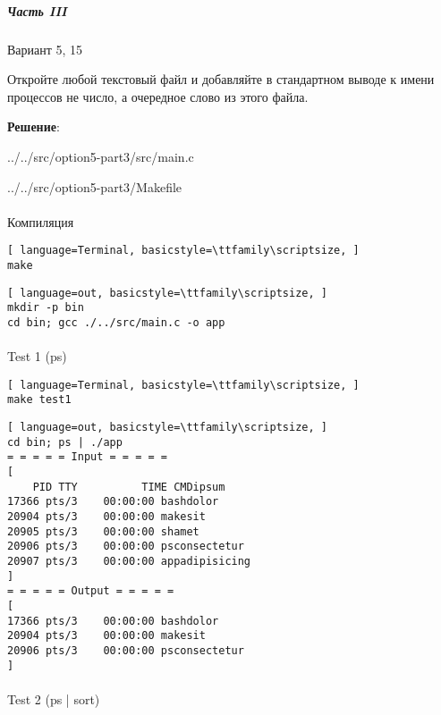\subparagraph{Часть III} Вариант 5, 15

Откройте любой текстовый файл и добавляйте в стандартном выводе к имени процессов не число, а очередное слово из этого файла.

\textbf{Решение}:


{../../src/option5-part3/src/main.c}


{../../src/option5-part3/Makefile}

\paragraph{}
Компиляция

\begin{lstlisting}[ language=Terminal, basicstyle=\ttfamily\scriptsize, ]
make
\end{lstlisting}

\begin{lstlisting}[ language=out, basicstyle=\ttfamily\scriptsize, ]
mkdir -p bin
cd bin; gcc ./../src/main.c -o app
\end{lstlisting}

\paragraph{}
Test 1 (ps)

\begin{lstlisting}[ language=Terminal, basicstyle=\ttfamily\scriptsize, ]
make test1
\end{lstlisting}

\begin{lstlisting}[ language=out, basicstyle=\ttfamily\scriptsize, ]
cd bin; ps | ./app
= = = = = Input = = = = =
[
    PID TTY          TIME CMDipsum
17366 pts/3    00:00:00 bashdolor
20904 pts/3    00:00:00 makesit
20905 pts/3    00:00:00 shamet
20906 pts/3    00:00:00 psconsectetur
20907 pts/3    00:00:00 appadipisicing
]
= = = = = Output = = = = =
[
17366 pts/3    00:00:00 bashdolor
20904 pts/3    00:00:00 makesit
20906 pts/3    00:00:00 psconsectetur
]
\end{lstlisting}

\paragraph{}
Test 2 (ps | sort)

